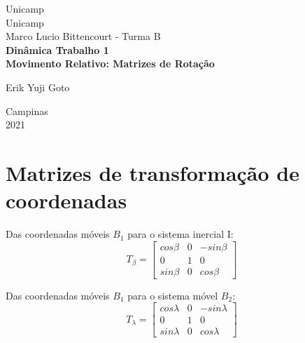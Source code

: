 \documentclass[a4paper, 12pt]{article}
\begin{document}
%
\begin{titlepage} %
	\begin{center} %
		{\large Unicamp}\\[0.2cm] %
		{\large Unicamp}\\[0.2cm] %
		{\large Marco Lucio Bittencourt - Turma B}\\[3.2cm]
		{\bf \huge Dinâmica Trabalho 1}\\[0.2cm] 
		{\bf \large Movimento Relativo: Matrizes de Rotação}\\[4.9cm]
	\end{center} %
	{\large Erik Yuji Goto}\\[10cm] %
	\begin{center}
	
		{\large Campinas}\\[0.2cm]
		{\large 2021}
	\end{center}
\end{titlepage} %


\tableofcontents
\newpage

\section{Matrizes de transformação de coordenadas}
	Das coordenadas móveis $B_1$ para o sistema inercial I:
	\begin{equation}
			T_\beta = \begin{bmatrix}
			cos\beta & 0 & -sin\beta\\
			0 & 1 & 0\\
			sin\beta & 0 & cos\beta
		\end{bmatrix}
	\end{equation}
	
	Das coordenadas móveis $B_1$ para o sistema móvel $B_2$:
	\begin{equation}
			T_\lambda = \begin{bmatrix}
			cos\lambda & 0 & -sin\lambda\\
			0 & 1 & 0\\
			sin\lambda & 0 & cos\lambda
		\end{bmatrix}
	\end{equation}
\end{document}

